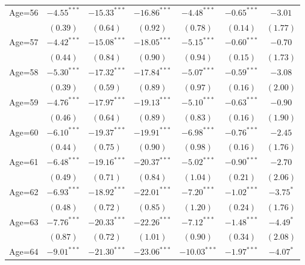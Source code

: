 \documentclass[fullpage]{paper}
\begin{document}
\begin{center}
\begin{longtable}{l c c c c c c }
Age=56      & $-4.55^{***}$ & $-15.33^{***}$ & $-16.86^{***}$ & $-4.48^{***}$  & $-0.65^{***}$ & $-3.01$       \\
            & $(0.39)$      & $(0.64)$       & $(0.92)$       & $(0.78)$       & $(0.14)$      & $(1.77)$      \\
Age=57      & $-4.42^{***}$ & $-15.08^{***}$ & $-18.05^{***}$ & $-5.15^{***}$  & $-0.60^{***}$ & $-0.70$       \\
            & $(0.44)$      & $(0.84)$       & $(0.90)$       & $(0.94)$       & $(0.15)$      & $(1.73)$      \\
Age=58      & $-5.30^{***}$ & $-17.32^{***}$ & $-17.84^{***}$ & $-5.07^{***}$  & $-0.59^{***}$ & $-3.08$       \\
            & $(0.39)$      & $(0.59)$       & $(0.89)$       & $(0.97)$       & $(0.16)$      & $(2.00)$      \\
Age=59      & $-4.76^{***}$ & $-17.97^{***}$ & $-19.13^{***}$ & $-5.10^{***}$  & $-0.63^{***}$ & $-0.90$       \\
            & $(0.46)$      & $(0.64)$       & $(0.89)$       & $(0.83)$       & $(0.16)$      & $(1.90)$      \\
Age=60      & $-6.10^{***}$ & $-19.37^{***}$ & $-19.91^{***}$ & $-6.98^{***}$  & $-0.76^{***}$ & $-2.45$       \\
            & $(0.44)$      & $(0.75)$       & $(0.90)$       & $(0.98)$       & $(0.16)$      & $(1.76)$      \\
Age=61      & $-6.48^{***}$ & $-19.16^{***}$ & $-20.37^{***}$ & $-5.02^{***}$  & $-0.90^{***}$ & $-2.70$       \\
            & $(0.49)$      & $(0.71)$       & $(0.84)$       & $(1.04)$       & $(0.21)$      & $(2.06)$      \\
Age=62      & $-6.93^{***}$ & $-18.92^{***}$ & $-22.01^{***}$ & $-7.20^{***}$  & $-1.02^{***}$ & $-3.75^{*}$   \\
            & $(0.48)$      & $(0.72)$       & $(0.85)$       & $(1.20)$       & $(0.24)$      & $(1.76)$      \\
Age=63      & $-7.76^{***}$ & $-20.33^{***}$ & $-22.26^{***}$ & $-7.12^{***}$  & $-1.48^{***}$ & $-4.49^{*}$   \\
            & $(0.87)$      & $(0.72)$       & $(1.01)$       & $(0.90)$       & $(0.34)$      & $(2.08)$      \\
Age=64      & $-9.01^{***}$ & $-21.30^{***}$ & $-23.06^{***}$ & $-10.03^{***}$ & $-1.97^{***}$ & $-4.07^{*}$   \\

\end{longtable}
\end{center}
\end{document}
